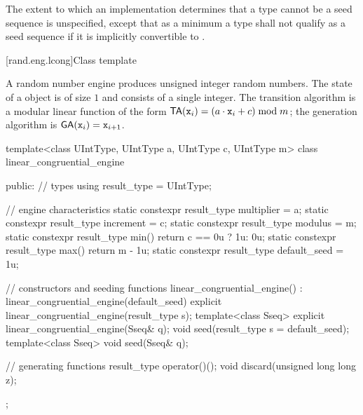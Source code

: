 The extent to which an implementation determines that a type cannot be a seed sequence
is unspecified, except that as a minimum a type shall not qualify as a seed sequence
if it is implicitly convertible to .


[rand.eng.lcong]{Class template }%
%

\pnum
A  random number engine
produces unsigned integer random numbers.
The state%
of a  object 
is of size $1$
and consists of a single integer.
The transition algorithm%
%
is a modular linear function of the form
$\mathsf{TA}(\texttt{x}_{i}) = (a \cdot \texttt{x}_{i} + c) \bmod m$;
the generation algorithm%
%
is $\mathsf{GA}(\texttt{x}_{i}) = \texttt{x}_{i+1}$.

%
\begin{codeblock}
template<class UIntType, UIntType a, UIntType c, UIntType m>
  class linear_congruential_engine {
  public:
    // types
    using result_type = UIntType;

    // engine characteristics
    static constexpr result_type multiplier = a;
    static constexpr result_type increment = c;
    static constexpr result_type modulus = m;
    static constexpr result_type min() { return c == 0u ? 1u: 0u; }
    static constexpr result_type max() { return m - 1u; }
    static constexpr result_type default_seed = 1u;

    // constructors and seeding functions
    linear_congruential_engine() : linear_congruential_engine(default_seed) {}
    explicit linear_congruential_engine(result_type s);
    template<class Sseq> explicit linear_congruential_engine(Sseq& q);
    void seed(result_type s = default_seed);
    template<class Sseq> void seed(Sseq& q);

    // generating functions
    result_type operator()();
    void discard(unsigned long long z);
  };
\end{codeblock}


